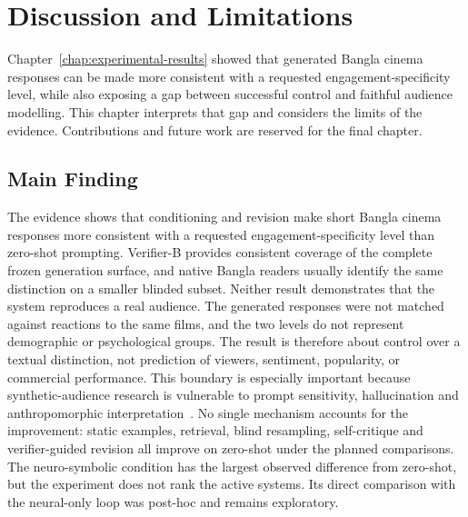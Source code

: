 
\chapter{Discussion and Limitations}
\label{chap:discussion}

\ifpdf
    \graphicspath{{Chapter7/Figs/Raster/}{Chapter7/Figs/PDF/}{Chapter7/Figs/}{Chapter7/figures/}}
\else
    \graphicspath{{Chapter7/Figs/Vector/}{Chapter7/Figs/}{Chapter7/figures/}}
\fi

Chapter~\ref{chap:experimental-results} showed that generated Bangla cinema responses can be made more consistent with a requested engagement-specificity level, while also exposing a gap between successful control and faithful audience modelling. This chapter interprets that gap and considers the limits of the evidence. Contributions and future work are reserved for the final chapter.

\section{Main Finding}
\label{sec:ch7-main-finding}

The evidence shows that conditioning and revision make short Bangla cinema responses more consistent with a requested engagement-specificity level than zero-shot prompting. Verifier-B provides consistent coverage of the complete frozen generation surface, and native Bangla readers usually identify the same distinction on a smaller blinded subset. Neither result demonstrates that the system reproduces a real audience. The generated responses were not matched against reactions to the same films, and the two levels do not represent demographic or psychological groups. The result is therefore about control over a textual distinction, not prediction of viewers, sentiment, popularity, or commercial performance. This boundary is especially important because synthetic-audience research is vulnerable to prompt sensitivity, hallucination and anthropomorphic interpretation~\citep{b1}. No single mechanism accounts for the improvement: static examples, retrieval, blind resampling, self-critique and verifier-guided revision all improve on zero-shot under the planned comparisons. The neuro-symbolic condition has the largest observed difference from zero-shot, but the experiment does not rank the active systems. Its direct comparison with the neural-only loop was post-hoc and remains exploratory.

